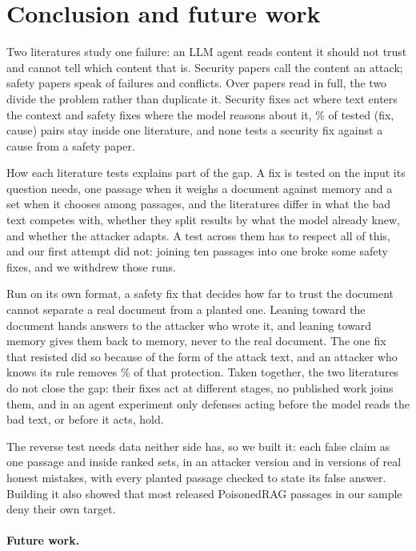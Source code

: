 \section{Conclusion and future work}
\label{sec:conclusion}

Two literatures study one failure: an LLM agent reads content it should not
trust and cannot tell which content that is. Security papers call the
content an attack; safety papers speak of failures and conflicts. Over
\NCorpus{} papers read in full, the two divide the problem rather than
duplicate it. Security fixes act where text enters the context and safety
fixes where the model reasons about it, \PctSameRegime{}\% of tested (fix,
cause) pairs stay inside one literature, and none tests a security fix
against a cause from a safety paper.

How each literature tests explains part of the gap. A fix is tested on the
input its question needs, one passage when it weighs a document against
memory and a set when it chooses among passages, and the literatures differ
in what the bad text competes with, whether they split results by what the
model already knew, and whether the attacker adapts. A test across them has
to respect all of this, and our first attempt did not: joining ten passages
into one broke some safety fixes, and we withdrew those runs.

Run on its own format, a safety fix that decides how far to trust the
document cannot separate a real document from a planted one. Leaning toward
the document hands answers to the attacker who wrote it, and leaning toward
memory gives them back to memory, never to the real document. The one fix that resisted did so because of the form of the
attack text, and an attacker who knows its rule removes
\PctAcdRemovedGradient{}\% of that protection. Taken together, the two
literatures do not close the gap: their fixes act at different stages, no
published work joins them, and in an agent experiment only defenses acting
before the model reads the bad text, or before it acts, hold.

The reverse test needs data neither side has, so we built it: each false
claim as one passage and inside ranked sets, in an attacker version and in
versions of real honest mistakes, with every planted passage checked to state
its false answer. Building it also showed that most released PoisonedRAG
passages in our sample deny their own target.

\paragraph{Future work.}

